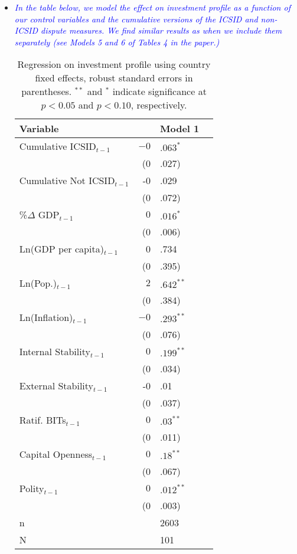 \begin{enumerate}
\begin{itemize}
		\item \textcolor{blue}{ \emph{ In the table below, we model the effect on investment profile as a function of our control variables and the cumulative versions of the ICSID and non-ICSID dispute measures. We find similar results as when we include them separately (see Models 5 and 6 of Tables 4 in the paper.) }}

			\begin{table}[ht]
			\centering
			\begingroup\footnotesize
			\begin{tabular}{lr@{}lr@{}}
			 Variable && Model 1 \\ 
			  \hline
			\hline
			Cumulative ICSID$_{t-1}$ & $-0$&$.063^{\ast}$ \\ 
			   & (0&.027) \\ 
			  Cumulative Not ICSID$_{t-1}$ & -0&.029 \\ 
			   & (0&.072) \\ 
			  \%$\Delta$ GDP$_{t-1}$ & $0$&$.016^{\ast}$ \\ 
			   & (0&.006) \\ 
			  Ln(GDP per capita)$_{t-1}$ & 0&.734 \\ 
			   & (0&.395) \\ 
			  Ln(Pop.)$_{t-1}$ & $2$&$.642^{\ast\ast}$ \\ 
			   & (0&.384) \\ 
			  Ln(Inflation)$_{t-1}$ & $-0$&$.293^{\ast\ast}$ \\ 
			   & (0&.076) \\ 
			  Internal Stability$_{t-1}$ & $0$&$.199^{\ast\ast}$ \\ 
			   & (0&.034) \\ 
			  External Stability$_{t-1}$ & -0&.01 \\ 
			   & (0&.037) \\ 
			  Ratif. BITs$_{t-1}$ & $0$&$.03^{\ast\ast}$ \\ 
			   & (0&.011) \\ 
			  Capital Openness$_{t-1}$ & $0$&$.18^{\ast\ast}$ \\ 
			   & (0&.067) \\ 
			  Polity$_{t-1}$ & $0$&$.012^{\ast\ast}$ \\ 
			   & (0&.003) \\ 
			   \hline
			n && 2603 \\ 
			  N && 101 \\ 
			   \hline
			\hline
			\end{tabular}
			\endgroup
			\caption{Regression on investment profile using country fixed effects, robust standard errors in parentheses. $^{**}$ and $^{*}$ indicate significance at $p< 0.05 $ and $p< 0.10 $, respectively.} 
			\end{table}		
			\FloatBarrier


\end{itemize}
\end{enumerate}
